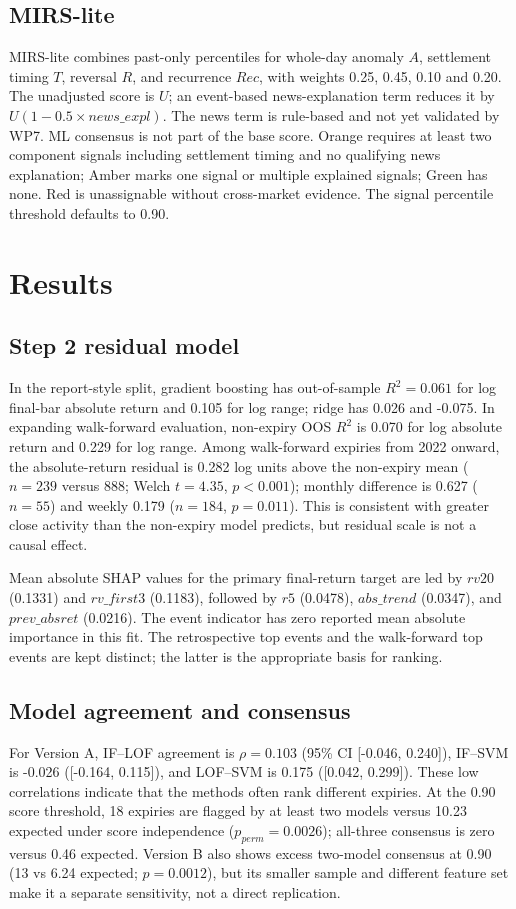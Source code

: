 \documentclass[11pt,a4paper]{article}
\begin{document}
\subsection{MIRS-lite}
MIRS-lite combines past-only percentiles for whole-day anomaly $A$, settlement timing $T$, reversal $R$, and recurrence $Rec$, with weights 0.25, 0.45, 0.10 and 0.20. The unadjusted score is $U$; an event-based news-explanation term reduces it by $U(1-0.5\times news\_expl)$. The news term is rule-based and not yet validated by WP7. ML consensus is not part of the base score. Orange requires at least two component signals including settlement timing and no qualifying news explanation; Amber marks one signal or multiple explained signals; Green has none. Red is unassignable without cross-market evidence. The signal percentile threshold defaults to 0.90.

\section{Results}
\subsection{Step 2 residual model}
In the report-style split, gradient boosting has out-of-sample $R^2=0.061$ for log final-bar absolute return and 0.105 for log range; ridge has 0.026 and -0.075. In expanding walk-forward evaluation, non-expiry OOS $R^2$ is 0.070 for log absolute return and 0.229 for log range. Among walk-forward expiries from 2022 onward, the absolute-return residual is 0.282 log units above the non-expiry mean ($n=239$ versus 888; Welch $t=4.35$, $p<0.001$); monthly difference is 0.627 ($n=55$) and weekly 0.179 ($n=184$, $p=0.011$). This is consistent with greater close activity than the non-expiry model predicts, but residual scale is not a causal effect.

Mean absolute SHAP values for the primary final-return target are led by $rv20$ (0.1331) and $rv\_first3$ (0.1183), followed by $r5$ (0.0478), $abs\_trend$ (0.0347), and $prev\_absret$ (0.0216). The event indicator has zero reported mean absolute importance in this fit. The retrospective top events and the walk-forward top events are kept distinct; the latter is the appropriate basis for ranking.

\subsection{Model agreement and consensus}
For Version A, IF--LOF agreement is $\rho=0.103$ (95\% CI [-0.046, 0.240]), IF--SVM is -0.026 ([-0.164, 0.115]), and LOF--SVM is 0.175 ([0.042, 0.299]). These low correlations indicate that the methods often rank different expiries. At the 0.90 score threshold, 18 expiries are flagged by at least two models versus 10.23 expected under score independence ($p_{perm}=0.0026$); all-three consensus is zero versus 0.46 expected. Version B also shows excess two-model consensus at 0.90 (13 vs 6.24 expected; $p=0.0012$), but its smaller sample and different feature set make it a separate sensitivity, not a direct replication.
\end{document}
